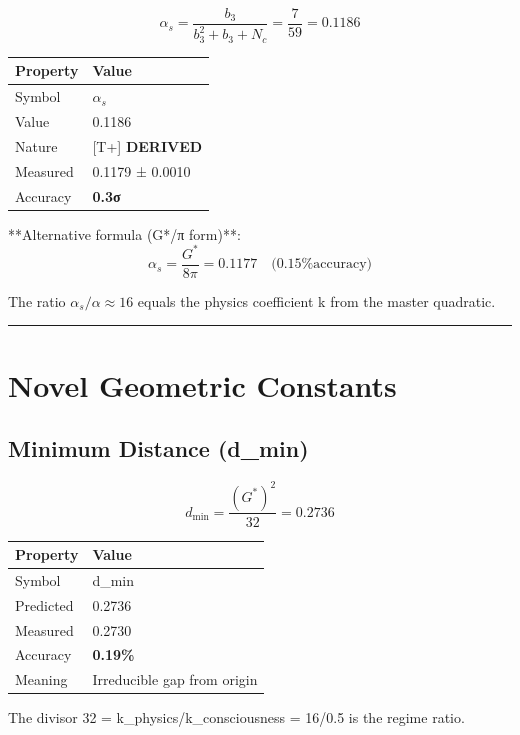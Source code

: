 \documentclass[
  11pt,
  letterpaper,
  twoside,
  openright]{book}
\begin{document}
\[
\alpha_s = \frac{b_3}{b_3^2 + b_3 + N_c} = \frac{7}{59} = 0.1186
\]

\begin{longtable}[]{@{}ll@{}}
\toprule\noalign{}
Property & Value \\
\midrule\noalign{}
\endhead
\bottomrule\noalign{}
\endlastfoot
Symbol & \(\alpha_s\) \\
Value & 0.1186 \\
Nature & {[}T+{]} \textbf{DERIVED} \\
Measured & 0.1179 ± 0.0010 \\
Accuracy & \textbf{0.3σ} \\
\end{longtable}

**Alternative formula (G*/π form)**:
\[\alpha_s = \frac{G^*}{8\pi} = 0.1177 \quad \text{(0.15\% accuracy)}\]

The ratio \(\alpha_s/\alpha \approx 16\) equals the physics coefficient
k from the master quadratic.

\begin{center}\rule{0.5\linewidth}{0.5pt}\end{center}

\section{Novel Geometric Constants}\label{novel-geometric-constants}

\subsection{Minimum Distance (d\_min)}\label{minimum-distance-d_min}

\[
d_{\min} = \frac{(G^*)^2}{32} = 0.2736
\]

\begin{longtable}[]{@{}ll@{}}
\toprule\noalign{}
Property & Value \\
\midrule\noalign{}
\endhead
\bottomrule\noalign{}
\endlastfoot
Symbol & d\_min \\
Predicted & 0.2736 \\
Measured & 0.2730 \\
Accuracy & \textbf{0.19\%} \\
Meaning & Irreducible gap from origin \\
\end{longtable}

The divisor 32 = k\_physics/k\_consciousness = 16/0.5 is the regime
ratio.
\end{document}
